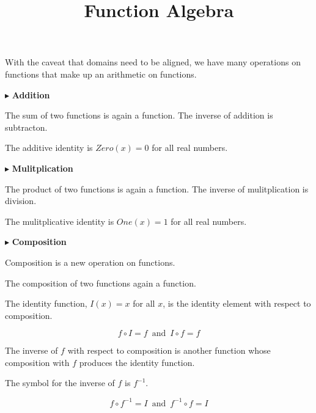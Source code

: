 \documentclass{ximera}
\title{Function Algebra}
\begin{document}
\begin{abstract}

\end{abstract}
\maketitle



With the caveat that domains need to be aligned, we have many operations on functions that make up an arithmetic on functions.




$\blacktriangleright$ \textbf{Addition} 

The sum of two functions is again a function. The inverse of addition is subtracton. 

The additive identity is $Zero(x) = 0$ for all real numbers.




$\blacktriangleright$ \textbf{Mulitplication} 

The product of two functions is again a function. The inverse of mulitplication is division. 

The mulitplicative identity is $One(x) = 1$ for all real numbers.



$\blacktriangleright$ \textbf{Composition} 

Composition is a new operation on functions.

The composition of two functions again a function. 

The identity function, $I(x) = x$ for all $x$, is the identity element with respect to composition.



\[   f \circ I = f    \, \text{ and } \, I \circ f = f        \]



The inverse of $f$ with respect to composition is another function whose composition with $f$ produces the identity function.

The symbol for the inverse of $f$ is $f^{-1}$.

\[   f \circ f^{-1} = I    \, \text{ and } \, f^{-1} \circ f = I       \]
\end{document}

